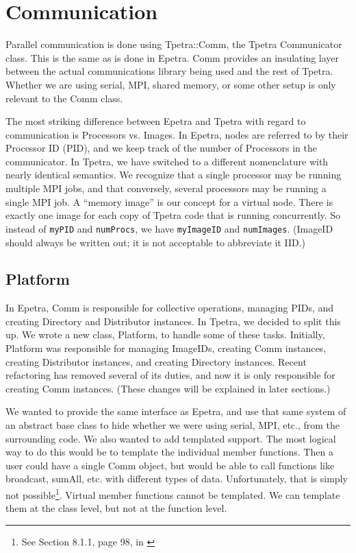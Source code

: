 \documentclass[10pt,relax]{TpetraDesign}
\begin{document}
%
\section{Communication}
Parallel communication is done using Tpetra::Comm, the Tpetra Communicator class. This is the same as is done in Epetra. Comm provides an insulating layer between the actual communications library being used and the rest of Tpetra. Whether we are using serial, MPI, shared memory, or some other setup is only relevant to the Comm class. 

The most striking difference between Epetra and Tpetra with regard to communication is Processors vs. Images. In Epetra, nodes are referred to by their Processor ID (PID), and we keep track of the number of Processors in the communicator. In Tpetra, we have switched to a different nomenclature with nearly identical semantics. We recognize that a single processor may be running multiple MPI jobs, and that conversely, several processors may be running a single MPI job. A ``memory image'' is our concept for a virtual node. There is exactly one image for each copy of Tpetra code that is running concurrently. So instead of \texttt{myPID} and \texttt{numProcs}, we have \texttt{myImageID} and \texttt{numImages}. (ImageID should always be written out; it is not acceptable to abbreviate it IID.)

%
\subsection{Platform}
In Epetra, Comm is responsible for collective operations, managing PIDs, and creating Directory and Distributor instances. In Tpetra, we decided to split this up. We wrote a new class, Platform, to handle some of these tasks. Initially, Platform was responsible for managing ImageIDs, creating Comm instances, creating Distributor instances, and creating Directory instances. Recent refactoring has removed several of its duties, and now it is only responsible for creating Comm instances. (These changes will be explained in later sections.)

We wanted to provide the same interface as Epetra, and use that same system of an abstract base class to hide whether we were using serial, MPI, etc., from the surrounding code. We also wanted to add templated support. The most logical way to do this would be to template the individual member functions. Then a user could have a single Comm object, but would be able to call functions like broadcast, sumAll, etc. with different types of data. Unfortunately, that is simply not possible\footnote{See Section 8.1.1, page 98, in \cite{Templates-Complete-Guide}}. Virtual member functions cannot be templated. We can template them at the class level, but not at the function level.
\end{document}
